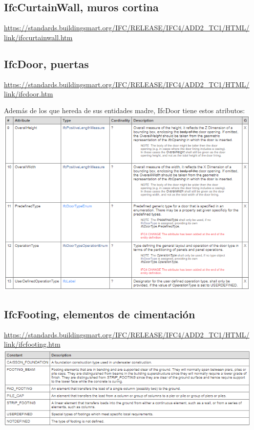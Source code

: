 \documentclass[spanish,12pt,a4paper,final,oneside]{book}
\begin{document}
\subsection{IfcCurtainWall, muros cortina}
\url{https://standards.buildingsmart.org/IFC/RELEASE/IFC4/ADD2_TC1/HTML/link/ifccurtainwall.htm}

\subsection{IfcDoor, puertas}
\url{https://standards.buildingsmart.org/IFC/RELEASE/IFC4/ADD2_TC1/HTML/link/ifcdoor.htm}

Además de los que hereda de sus entidades madre, IfcDoor tiene estos atributos:
\\ \includegraphics[width=\textwidth]{atributos de IfcDoor}

\subsection{IfcFooting, elementos de cimentación}
\url{https://standards.buildingsmart.org/IFC/RELEASE/IFC4/ADD2_TC1/HTML/link/ifcfooting.htm}
\\ \includegraphics[width=\textwidth]{Definicion de IfcFootingTypeEnum}
\end{document}

